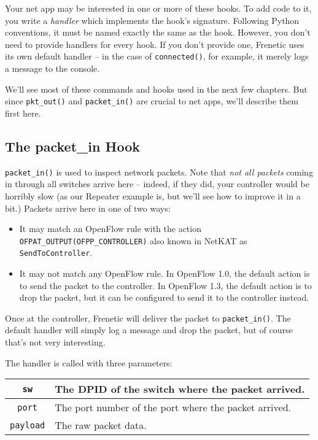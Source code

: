 \bigskip
Your net app may be interested in one or more of these hooks.
To add code to it, you write a \emph{handler} which implements the hook's signature.
Following Python conventions, it must be named exactly the same as the hook.
However, you don't need to provide handlers for every hook.
If you don't provide one, Frenetic uses its own default handler -- in the case of \texttt{connected()}, for example, it
merely logs a message to the console.  

We'll see most of these commands and hooks used in the next few chapters.  
But since \texttt{pkt\_out()} and \texttt{packet\_in()} are crucial to net apps, we'll describe them first here.

\subsection{The packet\_in Hook}

\texttt{packet\_in()} is used to inspect network packets.  
Note that \emph{not all packets} coming in through all switches 
arrive here -- indeed, if they did, your controller would be
horribly slow (as our Repeater example is, but we'll see how to improve it in a bit.)
Packets arrive here in one of two ways:

\begin{itemize}
\item It may match an OpenFlow rule with the action \texttt{OFPAT\_OUTPUT(OFPP\_CONTROLLER)}
also known in NetKAT as \texttt{SendToController}.
\item It may not match any OpenFlow rule.  
In OpenFlow 1.0, the default action is to send the packet to the controller.
In OpenFlow 1.3, the default action is to drop the packet, but it can be configured to send it to the controller 
instead.  
\end{itemize}

Once at the controller, Frenetic will deliver the packet to \texttt{packet\_in()}. 
The default handler will simply log a message and drop the packet, but of course that's not very interesting.

The handler is called with three parameters:

\bigskip
\begin{tabularx}{6in}{|c|X|}
\hline\hline
\texttt{sw} & The DPID of the switch where the packet arrived.
\\ \hline
\texttt{port} & The port number of the port where the packet arrived.
\\ \hline
\texttt{payload} & The raw packet data.
\\ \hline\hline
\end{tabularx}

